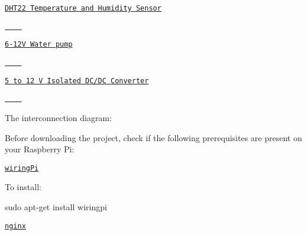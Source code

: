\begin{DoxyItemize}
\item \href{https://www.amazon.co.uk/gp/product/B01N6PB489/ref=ppx_yo_dt_b_asin_title_o01_s00?ie=UTF8&psc=1}{\tt D\+H\+T22 Temperature and Humidity Sensor}
\end{DoxyItemize}

\href{https://www.amazon.co.uk/gp/product/B01N6PB489/ref=ppx_yo_dt_b_asin_title_o01_s00?ie=UTF8&psc=1}{\tt ~~~ }


\begin{DoxyItemize}
\item \href{https://www.amazon.co.uk/gp/product/B0744FWNFR/ref=ppx_yo_dt_b_asin_title_o07_s00?ie=UTF8&psc=1}{\tt 6-\/12V Water pump}
\end{DoxyItemize}

\href{https://www.amazon.co.uk/gp/product/B0744FWNFR/ref=ppx_yo_dt_b_asin_title_o07_s00?ie=UTF8&psc=1}{\tt ~~~ }


\begin{DoxyItemize}
\item \href{https://www.mouser.co.uk/ProductDetail/TRACO-Power/TRA-1-0512?qs=ckJk83FOD0VZ5q6Ozn6vsw==&utm_source=OEMSECRETS&utm_medium=aggregator&utm_campaign=TRA+1-0512&utm_term=TRA+10512&utm_content=TRACO+Power}{\tt 5 to 12 V Isolated D\+C/\+DC Converter}
\end{DoxyItemize}

\href{https://www.mouser.co.uk/ProductDetail/TRACO-Power/TRA-1-0512?qs=ckJk83FOD0VZ5q6Ozn6vsw==&utm_source=OEMSECRETS&utm_medium=aggregator&utm_campaign=TRA+1-0512&utm_term=TRA+10512&utm_content=TRACO+Power}{\tt ~~~ }

The interconnection diagram\+: 

Before downloading the project, check if the following prerequisites are present on your Raspberry Pi\+:


\begin{DoxyItemize}
\item \href{http://wiringpi.com/}{\tt wiring\+Pi}
\end{DoxyItemize}

To install\+: 
\begin{DoxyCode}
sudo apt-get install wiringpi
\end{DoxyCode}

\begin{DoxyItemize}
\item \href{https://www.nginx.com/}{\tt nginx}
\end{DoxyItemize}

